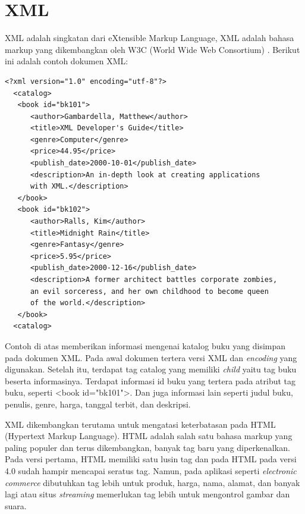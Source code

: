\section{XML}
XML adalah singkatan dari eXtensible Markup Language, XML adalah bahasa markup 
yang dikembangkan oleh W3C (World Wide Web Consortium)
\cite{Benoit:2000}. Berikut ini adalah contoh dokumen XML:
\lstset{basicstyle=\normalsize}
\begin{lstlisting}
<?xml version="1.0" encoding="utf-8"?>
  <catalog>
   <book id="bk101">
      <author>Gambardella, Matthew</author>
      <title>XML Developer's Guide</title>
      <genre>Computer</genre>
      <price>44.95</price>
      <publish_date>2000-10-01</publish_date>
      <description>An in-depth look at creating applications 
      with XML.</description>
   </book>
   <book id="bk102">
      <author>Ralls, Kim</author>
      <title>Midnight Rain</title>
      <genre>Fantasy</genre>
      <price>5.95</price>
      <publish_date>2000-12-16</publish_date>
      <description>A former architect battles corporate zombies, 
      an evil sorceress, and her own childhood to become queen 
      of the world.</description>
   </book>
  <catalog>
\end{lstlisting}
Contoh di atas memberikan informasi mengenai katalog buku yang disimpan pada
dokumen XML. Pada awal dokumen tertera versi XML dan \textit{encoding} yang
digunakan. Setelah itu, terdapat tag catalog yang memiliki \textit{child} yaitu
tag buku beserta informasinya. Terdapat informasi id buku yang tertera pada atribut tag buku,
seperti <book id="bk101">. Dan juga informasi lain seperti judul buku, penulis,
genre, harga, tanggal terbit, dan deskripsi.

XML dikembangkan terutama 
untuk mengatasi keterbatasan pada HTML (Hypertext Markup Language). HTML adalah 
salah satu bahasa markup yang paling populer dan terus dikembangkan, banyak tag baru 
yang diperkenalkan. Pada versi pertama, HTML memiliki satu lusin tag dan pada
HTML pada versi 4.0 sudah hampir mencapai seratus tag. Namun, pada aplikasi
seperti \textit{electronic commerce} dibutuhkan tag lebih untuk produk, harga, nama,
alamat, dan banyak lagi atau situs \textit{streaming} memerlukan tag lebih untuk
mengontrol gambar dan suara.
\lstset{language=XML}

